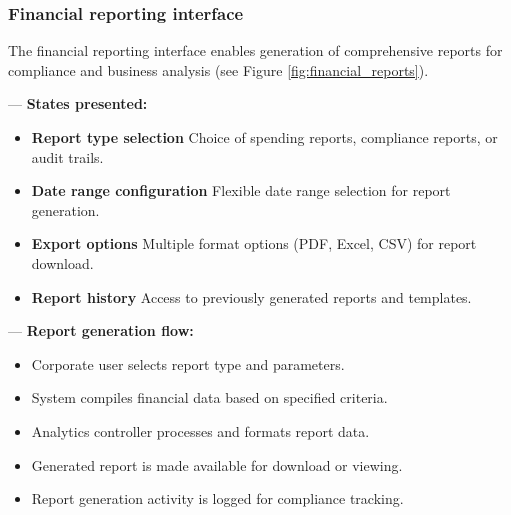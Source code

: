 \subsubsection{Financial reporting interface}

The financial reporting interface enables generation of comprehensive reports for compliance and business analysis (see Figure \ref{fig:financial_reports}).


— \textbf{States presented:}
\begin{itemize}[nosep,leftmargin=*,label=•]
  \item \textbf{Report type selection}  
    Choice of spending reports, compliance reports, or audit trails.
  \item \textbf{Date range configuration}  
    Flexible date range selection for report generation.
  \item \textbf{Export options}  
    Multiple format options (PDF, Excel, CSV) for report download.
  \item \textbf{Report history}  
    Access to previously generated reports and templates.
\end{itemize}

— \textbf{Report generation flow:}
\begin{itemize}[nosep,leftmargin=*,label=•]
  \item Corporate user selects report type and parameters.
  \item System compiles financial data based on specified criteria.
  \item Analytics controller processes and formats report data.
  \item Generated report is made available for download or viewing.
  \item Report generation activity is logged for compliance tracking.
\end{itemize}
